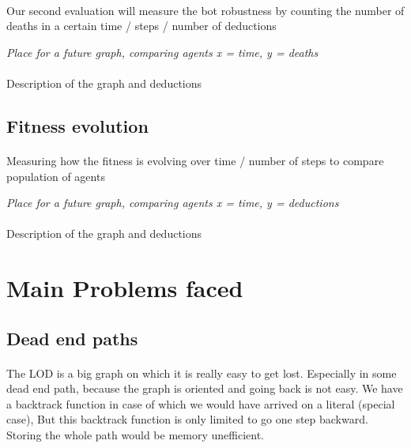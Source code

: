 \documentclass{article}
\begin{document}
		\paragraph{}
			Our second evaluation will measure the bot robustness by counting the number of deaths
			in a certain time / steps / number of deductions
		\begin{center}
			\textit{Place for a future graph, comparing agents x = time, y = deaths}
		\end{center}
		\paragraph{}
			Description of the graph and deductions
	\subsection{Fitness evolution}
		\paragraph{}
			Measuring how the fitness is evolving over time / number of steps to compare population of agents
		\begin{center}
			\textit{Place for a future graph, comparing agents x = time, y = deductions}
		\end{center}
		\paragraph{}
			Description of the graph and deductions

\section{Main Problems faced}
	\subsection{Dead end paths}
		\paragraph{}
			The LOD is a big graph on which it is really easy to get lost.
			Especially in some dead end path, because the graph is oriented and going back is not easy.
			We have a backtrack function in case of which we would have arrived on a literal (special case),
			But this backtrack function is only limited to go one step backward.
			Storing the whole path would be memory unefficient.
\end{document}

